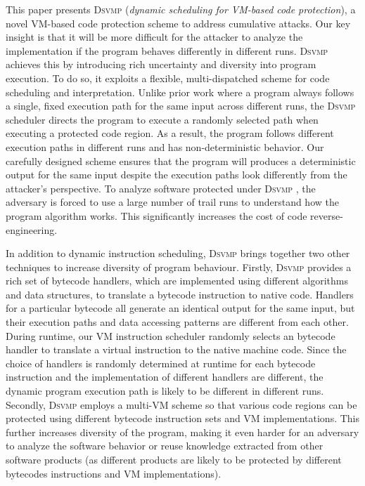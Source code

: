 \documentclass[preprint,12pt,3p]{elsarticle}
\newcommand{\DSVMP}{\textsc{Dsvmp }}
\begin{document}
This paper presents \DSVMP (\emph{dynamic scheduling for VM-based code protection}),
a novel VM-based code protection scheme to address cumulative attacks.
Our key insight is that it will be more difficult for the attacker
to analyze the implementation if the program behaves differently in different runs.
\DSVMP achieves this by introducing rich uncertainty and diversity into program execution.
To do so, it exploits a flexible, multi-dispatched scheme for code scheduling and interpretation.
Unlike prior work where a program always follows a single, fixed execution path for the same input across different runs,
the \DSVMP scheduler directs the program to execute a randomly selected path when executing a protected code region.
As a result, the program follows different execution paths in different runs and has non-deterministic behavior.
Our carefully designed scheme ensures that the program will produces a deterministic output
for the same input despite the execution paths look differently from the attacker's perspective.
To analyze software protected under \DSVMP, the adversary is forced to use a large number of trail runs
to understand how the program algorithm works. This significantly increases the cost of code reverse-engineering.


In addition to dynamic instruction scheduling, \DSVMP brings together two other techniques to increase diversity of program behaviour.
Firstly, \DSVMP provides a rich set of bytecode handlers, which are implemented using different algorithms and data structures,
to translate a bytecode instruction to native code.
Handlers for a particular bytecode all generate an identical output for the same input,
but their execution paths and data accessing patterns are different from each other.
During runtime, our VM instruction scheduler randomly selects an bytecode handler
to translate a virtual instruction to the native machine code.
Since the choice of handlers is randomly determined at runtime for each bytecode
instruction and the implementation of different handlers are different,
the dynamic program execution path is likely to be different in different runs.
Secondly, \DSVMP employs a multi-VM scheme so that various code regions
can be protected using different bytecode instruction sets and VM implementations.
This further increases diversity of the program, making it even harder for an adversary to analyze
the software behavior or reuse knowledge extracted from other software products
(as different products are likely to be protected by different bytecodes instructions and VM implementations).
\end{document}
